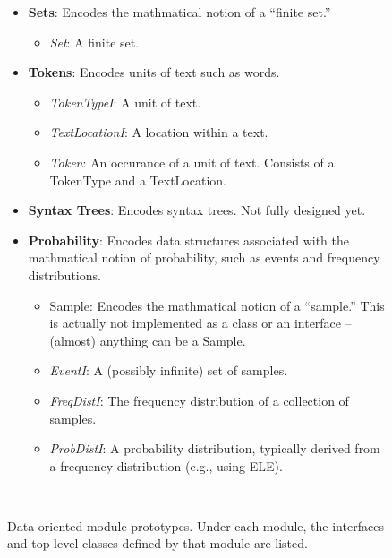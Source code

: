 \documentclass{article}
\begin{document}
\begin{figure}
\noindent
\begin{centering}
\begin{boxedminipage}{.95\textwidth}
\begin{itemize}
  \item \textbf{Sets}: Encodes the mathmatical notion of a ``finite set.''
  \begin{itemize}
    \item \textit{Set}: A finite set.
  \end{itemize}

  \item \textbf{Tokens}: Encodes units of text such as words.
  \begin{itemize}
    \item \textit{TokenTypeI}:
         A unit of text.
    \item \textit{TextLocationI}:
         A location within a text.
    \item \textit{Token}:
         An occurance of a unit of text.
         Consists of a TokenType and a TextLocation.
  \end{itemize}

  \item \textbf{Syntax Trees}: Encodes syntax trees.  Not fully designed 
        yet.

  \item \textbf{Probability}: Encodes data structures associated with
        the mathmatical notion of probability, such as events and
        frequency distributions.
  \begin{itemize}
    \item Sample: Encodes the mathmatical notion of a
          ``sample.''  This is actually not implemented as a class or
          an interface -- (almost) anything can be a Sample.
    \item \textit{EventI}:
         A (possibly infinite) set of samples.
    \item \textit{FreqDistI}:
          The frequency distribution of a collection of samples.
    \item \textit{ProbDistI}:
          A probability distribution, typically derived from a
          frequency distribution (e.g., using ELE).
  \end{itemize}
\end{itemize}
\end{boxedminipage}\\
\end{centering}
 \caption[Data-oriented module prototypes]{Data-oriented module
 prototypes.  Under each module, the interfaces and top-level classes
 defined by that module are listed.}
\label{fig:mod-data}
\end{figure}
\end{document}
